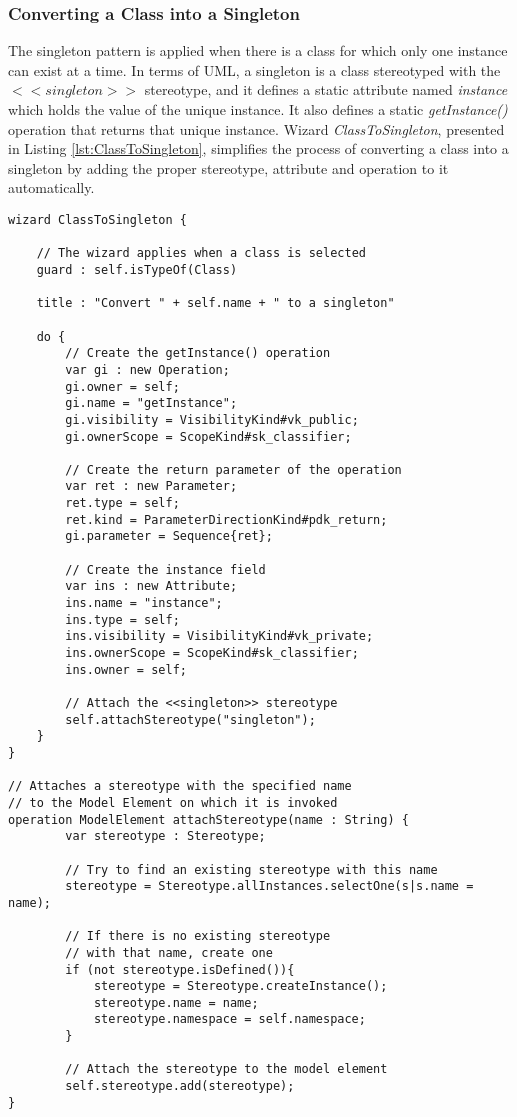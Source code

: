 \subsubsection{Converting a Class into a Singleton}
\label{sec:ClassToSingleton}

The singleton pattern \cite{Larman} is applied when there is a class for which only one instance can exist at a time. In terms of UML, a singleton is a class stereotyped with the $<<singleton>>$ stereotype, and it defines a static attribute named \emph{instance} which holds the value of the unique instance. It also defines a static \emph{getInstance()} operation that returns that unique instance. Wizard \emph{ClassToSingleton}, presented in Listing \ref{lst:ClassToSingleton}, simplifies the process of converting a class into a singleton by adding the proper stereotype, attribute and operation to it automatically.

\begin{lstlisting}[float=tbp, 
	basicstyle=\ttfamily\footnotesize, 
	flexiblecolumns=true,
	numbers=none,
	nolol=true,
	caption=Implementation of the ClassToSingleton Wizard, 
	label=lst:ClassToSingleton,
	numbers=left,
	language=EWL,
	tabsize=2
]
wizard ClassToSingleton {
	
	// The wizard applies when a class is selected
	guard : self.isTypeOf(Class)
	
	title : "Convert " + self.name + " to a singleton"
	
	do {
		// Create the getInstance() operation 
		var gi : new Operation; 
		gi.owner = self; 
		gi.name = "getInstance"; 
		gi.visibility = VisibilityKind#vk_public; 
		gi.ownerScope = ScopeKind#sk_classifier; 
		
		// Create the return parameter of the operation 
		var ret : new Parameter; 
		ret.type = self; 
		ret.kind = ParameterDirectionKind#pdk_return; 
		gi.parameter = Sequence{ret}; 
		
		// Create the instance field 
		var ins : new Attribute; 
		ins.name = "instance"; 
		ins.type = self; 
		ins.visibility = VisibilityKind#vk_private; 
		ins.ownerScope = ScopeKind#sk_classifier; 
		ins.owner = self; 
		
		// Attach the <<singleton>> stereotype 
		self.attachStereotype("singleton");
	}
}

// Attaches a stereotype with the specified name
// to the Model Element on which it is invoked
operation ModelElement attachStereotype(name : String) {
		var stereotype : Stereotype;
		
		// Try to find an existing stereotype with this name
		stereotype = Stereotype.allInstances.selectOne(s|s.name = name);
		
		// If there is no existing stereotype
		// with that name, create one
		if (not stereotype.isDefined()){
			stereotype = Stereotype.createInstance();
			stereotype.name = name;
			stereotype.namespace = self.namespace;
		}
		
		// Attach the stereotype to the model element
		self.stereotype.add(stereotype);
}
\end{lstlisting}

